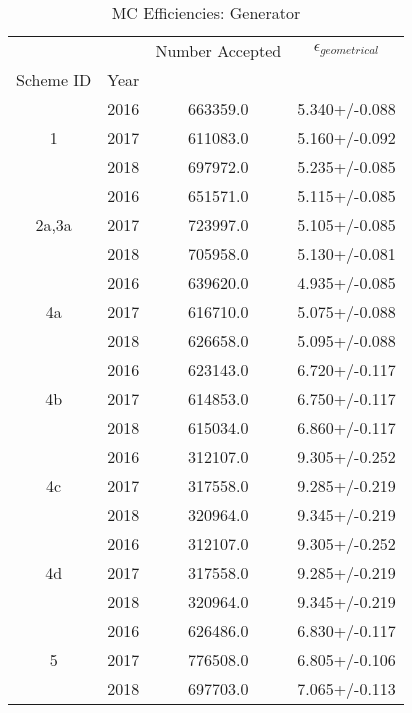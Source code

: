 \begin{table}
\centering
\caption{MC Efficiencies: Generator}
\label{tab:genstrip_1}
\begin{tabular}{cccc}
\toprule
   &      &  Number Accepted & $\epsilon_{geometrical}$ \\
Scheme ID & Year &                  &                          \\
\midrule
\multirow{3}{*}{1} & 2016 &         663359.0 &            5.340+/-0.088 \\
   & 2017 &         611083.0 &            5.160+/-0.092 \\
   & 2018 &         697972.0 &            5.235+/-0.085 \\
\cline{1-4}
\multirow{3}{*}{2a,3a} & 2016 &         651571.0 &            5.115+/-0.085 \\
   & 2017 &         723997.0 &            5.105+/-0.085 \\
   & 2018 &         705958.0 &            5.130+/-0.081 \\
\cline{1-4}
\multirow{3}{*}{4a} & 2016 &         639620.0 &            4.935+/-0.085 \\
   & 2017 &         616710.0 &            5.075+/-0.088 \\
   & 2018 &         626658.0 &            5.095+/-0.088 \\
\cline{1-4}
\multirow{3}{*}{4b} & 2016 &         623143.0 &            6.720+/-0.117 \\
   & 2017 &         614853.0 &            6.750+/-0.117 \\
   & 2018 &         615034.0 &            6.860+/-0.117 \\
\cline{1-4}
\multirow{3}{*}{4c} & 2016 &         312107.0 &            9.305+/-0.252 \\
   & 2017 &         317558.0 &            9.285+/-0.219 \\
   & 2018 &         320964.0 &            9.345+/-0.219 \\
\cline{1-4}
\multirow{3}{*}{4d} & 2016 &         312107.0 &            9.305+/-0.252 \\
   & 2017 &         317558.0 &            9.285+/-0.219 \\
   & 2018 &         320964.0 &            9.345+/-0.219 \\
\cline{1-4}
\multirow{3}{*}{5} & 2016 &         626486.0 &            6.830+/-0.117 \\
   & 2017 &         776508.0 &            6.805+/-0.106 \\
   & 2018 &         697703.0 &            7.065+/-0.113 \\

\end{tabular}
\end{table}
